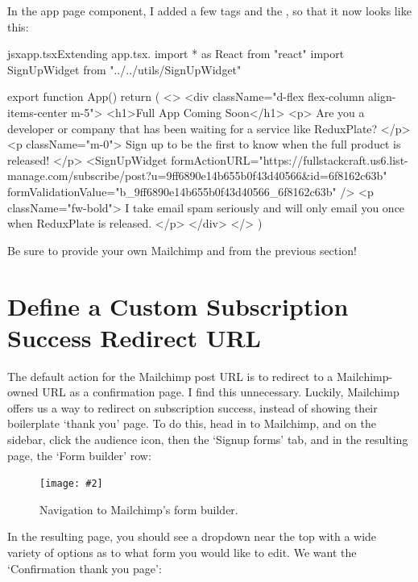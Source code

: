 \documentclass[paper=6in:9in,pagesize=pdftex,headinclude=on,footinclude=on,12pt,twoside]{scrbook}
\newcommand{\standardfigure}[3]{\begin{figure}[H]\begin{center}\texttt{[image: \#2]}\caption{#3}\label{fig:#2}\end{center}\end{figure}}
\begin{document}

In the app page component, I added a few  tags and the , so that it now looks like this:

\begin{codeInput}{jsx}{app.tsx}{Extending app.tsx.}
import * as React from "react"
import { SignUpWidget } from "../../utils/SignUpWidget"

export function App() {
  return (
    <>
      <div className="d-flex flex-column align-items-center m-5">
        <h1>Full App Coming Soon</h1>
        <p>
          Are you a developer or company that has been waiting for a service
          like ReduxPlate?
        </p>
        <p className="m-0">
          Sign up to be the first to know when the full product is released!
        </p>
        <SignUpWidget
          formActionURL="https://fullstackcraft.us6.list-manage.com/subscribe/post?u=9ff6890e14b655b0f43d40566&id=6f8162c63b"
          formValidationValue="b_9ff6890e14b655b0f43d40566_6f8162c63b"
        />
        <p className="fw-bold">
          I take email spam seriously and will only email you once when ReduxPlate is released.
        </p>
      </div>
    </>
  )
}  
\end{codeInput}

Be sure to provide your own Mailchimp  and  from the previous section!

\section{Define a Custom Subscription Success Redirect URL}

The default action for the Mailchimp post URL is to redirect to a Mailchimp-owned URL as a confirmation page. I find this unnecessary. Luckily, Mailchimp offers us a way to redirect on subscription success, instead of showing their boilerplate `thank you' page. To do this, head in to Mailchimp, and on the sidebar, click the audience icon, then the `Signup forms' tab, and in the resulting page, the `Form builder' row:

\standardfigure{\textwidth}{frontend/mailchimp/navigation-to-form-builder}{Navigation to Mailchimp's form builder.}

In the resulting page, you should see a dropdown near the top with a wide variety of options as to what form you would like to edit. We want the `Confirmation thank you page':
\end{document}
